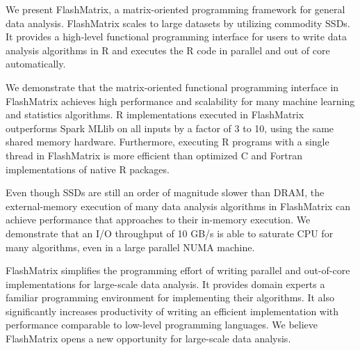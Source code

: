 We present FlashMatrix, a matrix-oriented programming framework for general
data analysis. FlashMatrix scales to large datasets by utilizing commodity SSDs.
It provides a high-level functional programming interface for users to write
data analysis algorithms in R and executes the R code in parallel and out of
core automatically.

We demonstrate that the matrix-oriented functional programming interface in
FlashMatrix achieves high performance and scalability for many machine learning and 
statistics algorithms.  R implementations executed in FlashMatrix outperforms
Spark MLlib on all inputs by a factor of 3 to 10, using the same shared memory hardware.
Furthermore, executing R programs with a single thread in FlashMatrix is more
efficient than optimized C and Fortran implementations of native R packages.


Even though SSDs are still an order of magnitude slower than DRAM, the external-memory
execution of many data analysis algorithms in FlashMatrix can achieve performance
that approaches to their in-memory execution. We demonstrate that an I/O throughput
of 10 GB/s is able to saturate CPU for many algorithms, even in a large parallel
NUMA machine. 

FlashMatrix simplifies the programming effort of writing
parallel and out-of-core implementations for large-scale data analysis. It
provides domain experts a familiar programming environment for implementing
their algorithms. It also significantly
increases productivity of writing an efficient implementation with performance
comparable to low-level programming languages. We believe FlashMatrix opens
a new opportunity for large-scale data analysis.
